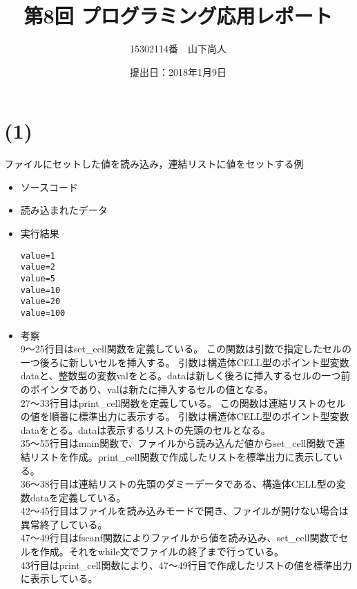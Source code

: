 \documentclass[a4paper]{jsarticle}
\title{第8回 プログラミング応用レポート}
\author{15302114番　山下尚人}
\date{提出日：2018年1月9日}
\begin{document}
\maketitle%

\section*{(1)}
	ファイルにセットした値を読み込み，連結リストに値をセットする例
	\begin{itemize}
	\item ソースコード
		 
		\mbox{}\newline
	\item 読み込まれたデータ
		 
		\mbox{}\newline
	\item 実行結果
		\begin{lstlisting}
value=1
value=2
value=5
value=10
value=20
value=100
		\end{lstlisting}
		\mbox{}\newline
	\item 考察\mbox{}\\
		9〜25行目はset\_cell関数を定義している。
		この関数は引数で指定したセルの一つ後ろに新しいセルを挿入する。
		引数は構造体CELL型のポイント型変数dataと、整数型の変数valをとる。dataは新しく後ろに挿入するセルの一つ前のポインタであり、valは新たに挿入するセルの値となる。\\
		
		27〜33行目はprint\_cell関数を定義している。
		この関数は連結リストのセルの値を順番に標準出力に表示する。
		引数は構造体CELL型のポイント型変数dataをとる。dataは表示するリストの先頭のセルとなる。\\
		
		35〜55行目はmain関数で、ファイルから読み込んだ値からset\_cell関数で連結リストを作成。print\_cell関数で作成したリストを標準出力に表示している。\\
		36〜38行目は連結リストの先頭のダミーデータである、構造体CELL型の変数dataを定義している。\\
		42〜45行目はファイルを読み込みモードで開き、ファイルが開けない場合は異常終了している。\\
		47〜49行目はfscanf関数によりファイルから値を読み込み、set\_cell関数でセルを作成。それをwhile文でファイルの終了まで行っている。\\
		43行目はprint\_cell関数により、47〜49行目で作成したリストの値を標準出力に表示している。\\ 
	\end{itemize}
	
\end{document}
